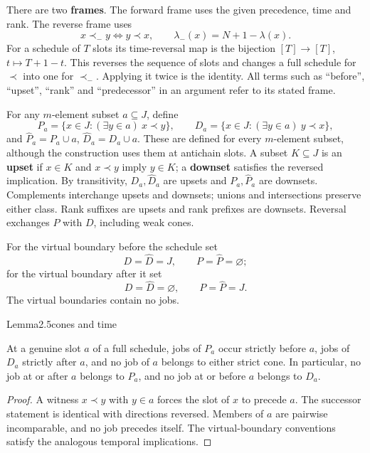 There are two \textbf{frames}. The forward frame uses the given precedence, time and rank. The reverse frame uses \[
x\prec_- y\iff y\prec x,\qquad
\lambda_-(x)=N+1-\lambda(x).
\] For a schedule of \(T\) slots its time-reversal map is the bijection \([T]\to[T]\), \(t\mapsto T+1-t\). This reverses the sequence of slots and changes a full schedule for \(\prec\) into one for \(\prec_-\). Applying it twice is the identity. All terms such as ``before'', ``upset'', ``rank'' and ``predecessor'' in an argument refer to its stated frame.

For any \(m\)-element subset \(a\subseteq J\), define \[
P_a=\{x\in J:(\exists y\in a)\ x\prec y\},\qquad
D_a=\{x\in J:(\exists y\in a)\ y\prec x\},
\] and \(\widehat P_a=P_a\cup a\), \(\widehat D_a=D_a\cup a\). These are defined for every \(m\)-element subset, although the construction uses them at antichain slots. A subset \(K\subseteq J\) is an \textbf{upset} if \(x\in K\) and \(x\prec y\) imply \(y\in K\); a \textbf{downset} satisfies the reversed implication. By transitivity, \(D_a,\widehat D_a\) are upsets and \(P_a,\widehat P_a\) are downsets. Complements interchange upsets and downsets; unions and intersections preserve either class. Rank suffixes are upsets and rank prefixes are downsets. Reversal exchanges \(P\) with \(D\), including weak cones.

For the virtual boundary before the schedule set \[
D=\widehat D=J,\qquad P=\widehat P=\varnothing;
\] for the virtual boundary after it set \[
D=\widehat D=\varnothing,\qquad P=\widehat P=J.
\] The virtual boundaries contain no jobs.

\begin{numbered}{Lemma}{2.5}{cones and time}

At a genuine slot \(a\) of a full schedule, jobs of \(P_a\) occur strictly before \(a\), jobs of \(D_a\) strictly after \(a\), and no job of \(a\) belongs to either strict cone. In particular, no job at or after \(a\) belongs to \(P_a\), and no job at or before \(a\) belongs to \(D_a\).

\end{numbered}

\begin{proof}
A witness \(x\prec y\) with \(y\in a\) forces the slot of \(x\) to precede \(a\). The successor statement is identical with directions reversed. Members of \(a\) are pairwise incomparable, and no job precedes itself. The virtual-boundary conventions satisfy the analogous temporal implications.
\end{proof}

